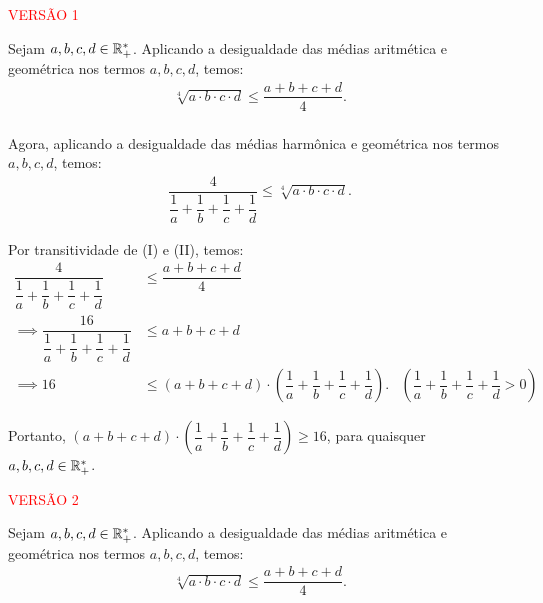 
\textcolor{red}{ VERSÃO 1 } %

Sejam $a, b, c, d \in \mathbb R_+^\ast$. Aplicando a desigualdade das médias
aritmética e geométrica nos termos $a , b, c ,d$, temos:
\begin{align*}
    \sqrt[4]{a\cdot b\cdot c\cdot d} \leq \dfrac{a+b+c+d}{4}.\tag{I} \\
\end{align*}

Agora, aplicando a desigualdade das médias harmônica e geométrica nos termos
$a, b, c, d$, temos:
\begin{align*}
    \dfrac{4}{\dfrac{1}{a}+\dfrac{1}{b}+\dfrac{1}{c}+\dfrac{1}{d}} \leq \sqrt[4]{a\cdot b\cdot c\cdot d}. \tag{II}
\end{align*}

Por transitividade de (I) e (II), temos:
\begin{align*}
    \dfrac{4}{\dfrac{1}{a}+\dfrac{1}{b}+\dfrac{1}{c}+\dfrac{1}{d}}           & \leq \dfrac{a+b+c+d}{4}                                                                                                                                      \\
    \implies \dfrac{16}{\dfrac{1}{a}+\dfrac{1}{b}+\dfrac{1}{c}+\dfrac{1}{d}} & \leq a+b+c+d                                                                                                                                                 \\
    \implies 16                                                              & \leq (a+b+c+d) \cdot \left(\dfrac{1}{a}+\dfrac{1}{b}+\dfrac{1}{c}+\dfrac{1}{d}\right). & \text{$\left(\dfrac 1 a+\dfrac 1 b+\dfrac 1 c+\dfrac 1 d>0\right)$}
\end{align*}

Portanto, $(a+b+c+d) \cdot
    \left(\dfrac{1}{a}+\dfrac{1}{b}+\dfrac{1}{c}+\dfrac{1}{d}\right) \geq 16$, para
quaisquer $a, b, c, d \in \mathbb R_+^\ast$.


\textcolor{red}{ VERSÃO 2} %

Sejam $a, b, c, d \in \mathbb R_+^\ast$. Aplicando a desigualdade das médias
aritmética e geométrica nos termos $a , b, c ,d$, temos:
\begin{align*}
    \sqrt[4]{a\cdot b\cdot c\cdot d} \leq \dfrac{a+b+c+d}{4}.\tag{I} \\
\end{align*}

